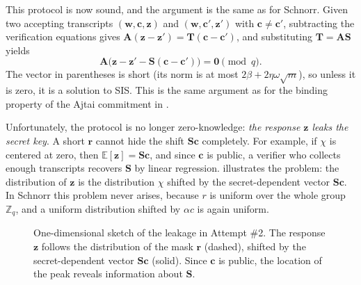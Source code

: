 \documentclass[../../book.tex]{subfiles}
\begin{document}
This protocol is now sound, and the argument is the same as for Schnorr.
Given two accepting transcripts $(\mathbf{w},\mathbf{c},\mathbf{z})$ and $(\mathbf{w},\mathbf{c}',\mathbf{z}')$ with $\mathbf{c} \neq \mathbf{c}'$, subtracting the verification equations gives $\mathbf{A}(\mathbf{z}-\mathbf{z}') = \mathbf{T}(\mathbf{c}-\mathbf{c}')$, and substituting $\mathbf{T} = \mathbf{A}\mathbf{S}$ yields
\begin{equation*}
    \mathbf{A}\bigl(\mathbf{z}-\mathbf{z}' - \mathbf{S}(\mathbf{c}-\mathbf{c}')\bigr) = \mathbf{0} \pmod q.
\end{equation*}
The vector in parentheses is short (its norm is at most $2\beta + 2\eta\omega\sqrt{m}$), so unless it is zero, it is a solution to SIS.
This is the same argument as for the binding property of the Ajtai commitment in .

Unfortunately, the protocol is no longer zero-knowledge: \emph{the response $\mathbf{z}$ leaks the secret key}.
A short $\mathbf{r}$ cannot hide the shift $\mathbf{S}\mathbf{c}$ completely.
For example, if $\chi$ is centered at zero, then $\mathbb{E}[\mathbf{z}] = \mathbf{S}\mathbf{c}$, and since $\mathbf{c}$ is public, a verifier who collects enough transcripts recovers $\mathbf{S}$ by linear regression.
 illustrates the problem: the distribution of $\mathbf{z}$ is the distribution $\chi$ shifted by the secret-dependent vector $\mathbf{S}\mathbf{c}$.
In Schnorr this problem never arises, because $r$ is uniform over the whole group $\mathbb{Z}_q$, and a uniform distribution shifted by $\alpha c$ is again uniform.

\begin{figure}[ht]
    \centering
    \caption{One-dimensional sketch of the leakage in Attempt \#2. The response $\mathbf{z}$ follows the distribution of the mask $\mathbf{r}$ (dashed), shifted by the secret-dependent vector $\mathbf{S}\mathbf{c}$ (solid). Since $\mathbf{c}$ is public, the location of the peak reveals information about $\mathbf{S}$.}
    \label{fig:leakage}
\end{figure}
\end{document}
